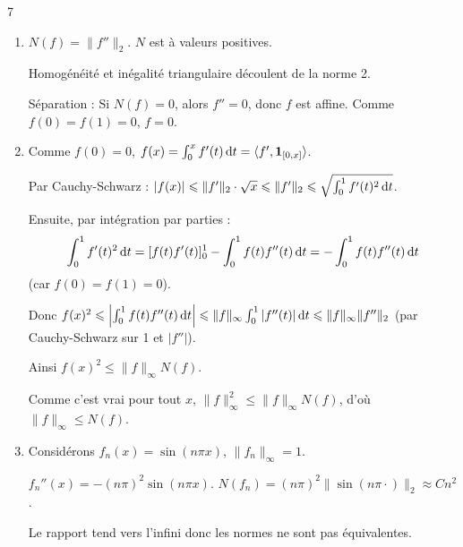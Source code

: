 \begin{correction}{7}
\begin{enumerate}
    \item $N(f) = \|f''\|_2$. $N$ est à valeurs positives. 
    
    Homogénéité et inégalité triangulaire découlent de la norme 2.

    Séparation : Si $N(f)=0$, alors $f''=0$, donc $f$ est affine. Comme $f(0)=f(1)=0$, $f=0$.

    \item Comme $f(0)=0$, $f(x) = \int_0^x f'(t) \,\mathrm{d}t = \langle f', \mathbf{1}_{[0,x]} \rangle$.

    Par Cauchy-Schwarz : $|f(x)| \leqslant \|f'\|_2 \cdot \sqrt{x} \leqslant \|f'\|_2 \leqslant \sqrt{\int_0^1 f'(t)^2 \,\mathrm{d}t}$.

    Ensuite, par intégration par parties : 
    \[\int_0^1 f'(t)^2 \,\mathrm{d}t = [f(t)f'(t)]_0^1 - \int_0^1 f(t)f''(t) \,\mathrm{d}t = - \int_0^1 f(t)f''(t) \,\mathrm{d}t\]
    (car $f(0)=f(1)=0$).

    Donc $f(x)^2 \leqslant \left| \int_0^1 f(t)f''(t) \,\mathrm{d}t \right| \leqslant \|f\|_\infty \int_0^1 |f''(t)| \,\mathrm{d}t \leqslant \|f\|_\infty \|f''\|_2$
    (par Cauchy-Schwarz sur 1 et $|f''|$).

    Ainsi $f(x)^2 \leqslant \|f\|_\infty N(f)$.

    Comme c'est vrai pour tout $x$, $\|f\|_\infty^2 \leqslant \|f\|_\infty N(f)$, d'où $\|f\|_\infty \leqslant N(f)$.

    \item Considérons $f_n(x) = \sin(n\pi x)$, $\|f_n\|_\infty = 1$.

    $f_n''(x) = -(n\pi)^2 \sin(n\pi x)$. $N(f_n) = (n\pi)^2 \|\sin(n\pi \cdot)\|_2 \approx C n^2$.
    
    Le rapport tend vers l'infini donc les normes ne sont pas équivalentes.
\end{enumerate}
\end{correction}

